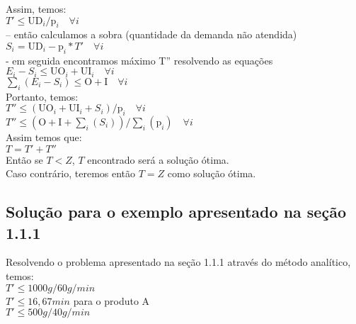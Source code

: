 \documentclass{book}
\begin{document}
 		Assim, temos: \\
 		
 		$ T' \leq \textrm{UD}_i/\textrm{p}_i \quad \forall i$ \\
 		
 		-- então calculamos a sobra (quantidade da demanda não atendida) \\
 		
 		$S_i = \textrm{UD}_i - \textrm{p}_i * T' \quad \forall i$ \\
 
 - em seguida encontramos máximo T'' resolvendo as equações \\
 
$E_i - S_i \leq \textrm{UO}_i + \textrm{UI}_i \quad \forall i$ \\

$\sum_i{(E_i- S_i)} \leq \textrm{O} + \textrm{I} \quad \forall i$ \\

Portanto, temos: \\
 
$T'' \leq (\textrm{UO}_i + \textrm{UI}_i + S_i) / \textrm{p}_i  \quad \forall i$ \\

$T'' \leq (\textrm{O} + \textrm{I} + \sum_i{(S_i)}) / \sum_i{(\textrm{p}_i)} \quad \forall i$ \\

Assim temos que: \\

$T = T' + T''$ \\

Então se $T<Z$, $T$ encontrado será a solução ótima. \\

Caso contrário, teremos então $T=Z$ como solução ótima. \\

\subsection{Solução para o exemplo apresentado na seção 1.1.1}

Resolvendo o problema apresentado na seção 1.1.1 através do método analítico, temos: \\

$T' \leq 1000g / 60g/min$ \\

$T' \leq 16,67 min$ \quad para o produto A \\

$T' \leq 500g / 40g/min$ \\
\end{document}
